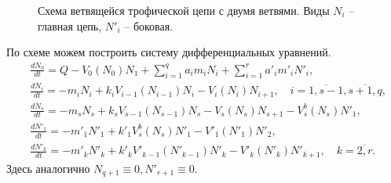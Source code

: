 \begin{figure}[H]
    \caption{Схема ветвящейся трофической цепи с двумя ветвями. Виды \(N_i\) -- главная цепь, \(N'_i\) -- боковая.} \label{schema_split}
\end{figure}

По схеме можем построить систему дифференциальных уравнений.
\begin{equation} \label{double_full}
    \begin{split}
        & \frac{d N_0}{dt} = Q - V_0(N_0) N_1 + \sum_{i=1}^q a_i m_i N_i + \sum_{i=1}^r a'_i m'_i N'_i, \\
        & \frac{d N_i}{dt} = -m_i N_i + k_i V_{i-1}(N_{i-1}) N_i - V_i(N_i) N_{i+1}, \quad i=\overline{1,s-1},  \overline{s+1,q}, \\
        & \frac{d N_s}{dt} = -m_s N_s + k_s V_{s-1}(N_{s-1}) N_s - V_s(N_s) N_{s+1} - V_s^b(N_s) N'_1, \\
        & \frac{d N'_1}{dt} = -m'_1 N'_1 + k'_1 V_s^b(N_s) N'_1 - V'_1(N'_1) N'_{2}, \\
        & \frac{d N'_k}{dt} = -m'_k N'_k + k'_k V'_{k-1}(N'_{k-1}) N'_k - V'_k(N'_k) N'_{k+1}, \quad k=\overline{2,r}.
    \end{split}
\end{equation} 
Здесь аналогично \(N_{q+1} \equiv 0, N'_{r+1} \equiv 0\).